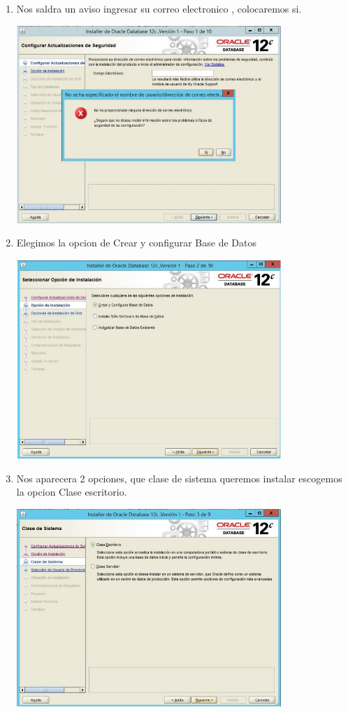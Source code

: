 \begin{enumerate}[1.]
           \item  Nos saldra un aviso ingresar su correo  electronico , colocaremos si.
 	\begin{center}
	\includegraphics[width=10cm]{./Imagenes/bran1} 
	\end{center}
           \item Elegimos la opcion de Crear y configurar Base de Datos
 	\begin{center}
	\includegraphics[width=10cm]{./Imagenes/bran2} 
	\end{center}
          \item Nos aparecera 2 opciones, que clase de sistema queremos instalar escogemos la opcion Clase escritorio.
 	\begin{center}
	\includegraphics[width=10cm]{./Imagenes/bran3} 

\end{center}
\end{enumerate}
